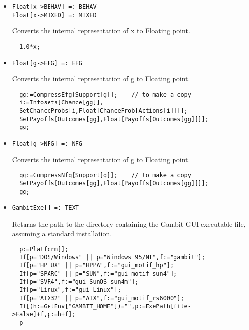 \begin{itemize}
\item{}
\protect \large \begin{verbatim}
Float[x->BEHAV] =: BEHAV 
Float[x->MIXED] =: MIXED 
\end{verbatim}\normalsize

\bd 
Converts the internal representation of x to Floating point.  
\begin{verbatim}
  1.0*x;
\end{verbatim} 
\ed

\item{}
\protect \large \begin{verbatim}
Float[g->EFG] =: EFG 
\end{verbatim}\normalsize

\bd 
Converts the internal representation of g to Floating point.  
\begin{verbatim}
  gg:=CompressEfg[Support[g]];    // to make a copy
  i:=Infosets[Chance[gg]];
  SetChanceProbs[i,Float[ChanceProb[Actions[i]]]];
  SetPayoffs[Outcomes[gg],Float[Payoffs[Outcomes[gg]]]];
  gg;
\end{verbatim} 
\ed

\item{}
\protect \large \begin{verbatim}
Float[g->NFG] =: NFG 
\end{verbatim}\normalsize

\bd 
Converts the internal representation of g to Floating point.  
\begin{verbatim}
  gg:=CompressNfg[Support[g]];    // to make a copy
  SetPayoffs[Outcomes[gg],Float[Payoffs[Outcomes[gg]]]];
  gg;
\end{verbatim} 
\ed


\item{}
\protect \large \begin{verbatim}
GambitExe[] =: TEXT 
\end{verbatim}\normalsize

\bd 
Returns the path to the directory containing the Gambit GUI executable
file, assuming a standard installation.  
\begin{verbatim}
  p:=Platform[];
  If[p="DOS/Windows" || p="Windows 95/NT",f:="gambit"];
  If[p="HP UX" || p="HPPA",f:="gui_motif_hp"];
  If[p="SPARC" || p="SUN",f:="gui_motif_sun4"];
  If[p="SVR4",f:="gui_SunOS_sun4m"];
  If[p="Linux",f:="gui_Linux"];
  If[p="AIX32" || p="AIX",f:="gui_motif_rs6000"];
  If[(h:=GetEnv["GAMBIT_HOME"])="",p:=ExePath[file->False]+f,p:=h+f];
  p
\end{verbatim} 
\ed


\end{itemize}
